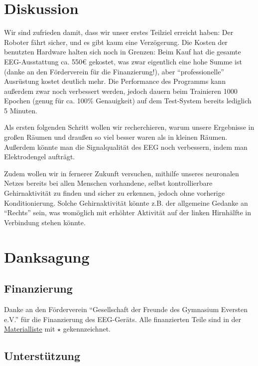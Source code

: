 \documentclass[11pt]{scrartcl}
\begin{document}
	\section{Diskussion}

	Wir sind zufrieden damit, dass wir unser erstes Teilziel erreicht haben: Der Roboter fährt sicher, und es gibt kaum eine Verzögerung. Die Kosten der benutzten Hardware halten sich noch in Grenzen: Beim Kauf hat die gesamte EEG-Ausstattung ca. 550€ gekostet, was zwar eigentlich eine hohe Summe ist (danke an den Förderverein für die Finanzierung!), aber \enquote{professionelle} Ausrüstung kostet deutlich mehr. Die Performance des Programms kann außerdem zwar noch verbessert werden, jedoch dauern beim Trainieren 1000 Epochen (genug für ca. 100\% Genauigkeit) auf dem Test-System bereits lediglich 5 Minuten. 

	Als ersten folgenden Schritt wollen wir recherchieren, warum unsere Ergebnisse in großen Räumen und draußen so viel besser waren als in kleinen Räumen. Außerdem könnte man die Signalqualität des EEG noch verbessern, indem man Elektrodengel aufträgt. 

	Zudem wollen wir in fernerer Zukunft versuchen, mithilfe unseres neuronalen Netzes bereits bei allen Menschen vorhandene, selbst kontrollierbare Gehirnaktivität zu finden und sicher zu erkennen, jedoch ohne vorherige Konditionierung. Solche Gehirnaktivität könnte z.B. der allgemeine Gedanke an \enquote{Rechts} sein, was womöglich mit erhöhter Aktivität auf der linken Hirnhälfte in Verbindung stehen könnte.
	
	\newpage

	\section{Danksagung}

	\subsection{Finanzierung} \label{Foerderverein}

	Danke an den Förderverein \enquote{Gesellschaft der Freunde des Gymnasium Eversten e.V.} für die Finanzierung des EEG-Geräts. Alle finanzierten Teile sind in der \hyperref[Materialien]{Materialliste} mit $\star$ gekennzeichnet. 

	\subsection{Unterstützung} \label{Unterstuetzung}
\end{document}

